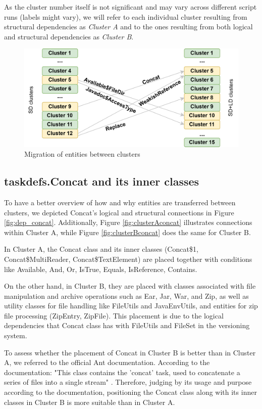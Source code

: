 \documentclass[12pt, a4paper, twoside]{report}
\begin{document}
As the cluster number itself is not significant and may vary across different script runs (labels might vary), we will refer to each individual cluster resulting from structural dependencies as \textit{Cluster A} and to the ones resulting from both logical and structural dependencies as \textit{Cluster B}.

\begin{figure}
\centering
\includegraphics[width=\columnwidth]{clusters.png}
\caption{Migration of entities between clusters}
\label{fig:clustersmigration}
\centering
\end{figure}

\subsection{taskdefs.Concat and its inner classes}

To have a better overview of how and why entities are transferred between clusters, we depicted Concat's logical and structural connections in Figure \ref{fig:dep_concat}. Additionally, Figure \ref{fig:clusterAconcat} illustrates connections within Cluster A, while Figure \ref{fig:clusterBconcat} does the same for Cluster B.

In Cluster A, the Concat class and its inner classes (Concat\$1, Concat\$MultiReader, Concat\$TextElement) are placed together with conditions like Available, And, Or, IsTrue, Equals, IsReference, Contains.

On the other hand, in Cluster B, they are placed with classes associated with file manipulation and archive operations such as Ear, Jar, War, and Zip, as well as utility classes for file handling like FileUtils and JavaEnvUtils, and entities for zip file processing (ZipEntry, ZipFile). This placement is due to the logical dependencies that Concat class has with FileUtils and FileSet in the versioning system.

To assess whether the placement of Concat in Cluster B is better than in Cluster A, we referred to the official Ant documentation. According to the documentation: "This class contains the 'concat' task, used to concatenate a series of files into a single stream" \cite{ant_concat}. Therefore, judging by its usage and purpose according to the documentation, positioning the Concat class along with its inner classes in Cluster B is more suitable than in Cluster A.
\end{document}
